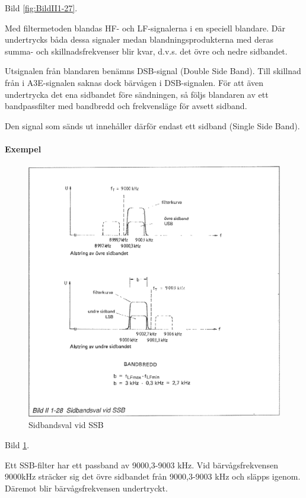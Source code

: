 Bild \ref{fig:BildII1-27}.

Med filtermetoden blandas HF- och LF-signalerna i en speciell blandare. Där
undertrycks båda dessa signaler medan blandningsprodukterna med deras summa-
och skillnadsfrekvenser blir kvar, d.v.s. det övre och nedre sidbandet.

Utsignalen från blandaren benämns DSB-signal (Double Side Band). Till skillnad
från i A3E-signalen saknas dock bärvågen i DSB-signalen. För att även
undertrycka det ena sidbandet före sändningen, så följs blandaren av ett
bandpassfilter med bandbredd och frekvensläge för avsett sidband.

Den signal som sänds ut innehåller därför endast ett sidband (Single Side Band).

\paragraph{Exempel}

\begin{figure}
\includegraphics[width=\textwidth]{images/bild_2_1-28}
\caption{Sidbandsval vid SSB}
\label{fig:BildII1-28}
\end{figure}

Bild \ref{fig:BildII1-28}.

Ett SSB-filter har ett passband av 9000,3-9003 kHz. Vid bärvågsfrekvensen 9000kHz
sträcker sig det övre sidbandet från 9000,3-9003 kHz och släpps igenom. Däremot
blir bärvågsfrekvensen undertryckt.

